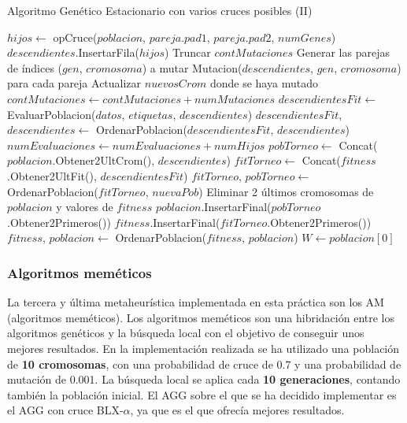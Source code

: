 \documentclass[11pt,a4paper]{article}
\begin{document}
\begin{algorithm}[H]
\caption{Algoritmo Genético Estacionario con varios cruces posibles (II)}
\begin{algorithmic}
		\State $hijos \gets $ opCruce($poblacion$, $pareja.pad1$, $pareja.pad2$, $numGenes$)
		\State $descendientes$.InsertarFila($hijos$)
	\EndFor
		\State Truncar $contMutaciones$
		\State Generar las parejas de índices ($gen$, $cromosoma$) a mutar
		\State Mutacion($descendientes$, $gen$, $cromosoma$) para cada pareja
		\State Actualizar $nuevosCrom$ donde se haya mutado
	\Else
		\State $contMutaciones \gets contMutaciones + numMutaciones$
	\EndIf
	\State $descendientesFit \gets$ EvaluarPoblacion($datos$, $etiquetas$, $descendientes$)
	\State $descendientesFit$, $descendientes \gets$ OrdenarPoblacion($descendientesFit$, $descendientes$)
	\State $numEvaluaciones \gets numEvaluaciones + numHijos$
	\State $pobTorneo \gets$ Concat($poblacion$.Obtener2UltCrom(), $descendientes$)
	\State $fitTorneo \gets$ Concat($fitness$.Obtener2UltFit(), $descendientesFit$)
	\State $fitTorneo$, $pobTorneo \gets$ OrdenarPoblacion($fitTorneo$, $nuevaPob$)
	\State Eliminar 2 últimos cromosomas de $poblacion$ y valores de $fitness$
	\State $poblacion$.InsertarFinal($pobTorneo$.Obtener2Primeros())
	\State $fitness$.InsertarFinal($fitTorneo$.Obtener2Primeros())
	\State $fitness$, $poblacion \gets$  OrdenarPoblacion($fitness$, $poblacion$)
\EndWhile
\State $W \gets poblacion[0]$
\State {}
\EndFunction
\end{algorithmic}
\end{algorithm}

\newpage

\subsubsection{Algoritmos meméticos}

La tercera y última metaheurística implementada en esta práctica son los AM (algoritmos meméticos). Los algoritmos meméticos
son una hibridación entre los algoritmos genéticos y la búsqueda local con el objetivo de conseguir unos mejores resultados. En
la implementación realizada se ha utilizado una población de \textbf{10 cromosomas}, con una probabilidad de cruce de 0.7 y una
probabilidad de mutación de 0.001. La búsqueda local se aplica cada \textbf{10 generaciones}, contando también la población
inicial. El AGG sobre el que se ha decidido implementar es el AGG con cruce BLX-$\alpha$, ya que es el que ofrecía mejores
resultados.
\end{document}
